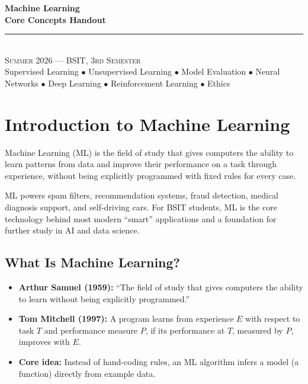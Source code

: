 \documentclass[11pt,a4paper]{article}
\begin{document}
\begin{center}
\vspace*{0.5cm}
{\Huge\bfseries\textcolor{primary}{Machine Learning}}\\[8pt]
{\Huge\bfseries\textcolor{primary}{Core Concepts Handout}}\\[16pt]
{\color{secondary}\rule{0.68\textwidth}{1.5pt}}\\[14pt]
{\Large\textsc{Summer 2026 --- BSIT, 3rd Semester}}\\[8pt]
{\large\textcolor{gray!70!black}{Supervised Learning $\bullet$ Unsupervised Learning $\bullet$ Model Evaluation $\bullet$ Neural Networks $\bullet$ Deep Learning $\bullet$ Reinforcement Learning $\bullet$ Ethics}}
\vspace{0.3cm}
\end{center}

\tableofcontents
\newpage

\section{Introduction to Machine Learning}

\begin{definitionbox}
Machine Learning (ML) is the field of study that gives computers the ability to learn patterns from data and improve their performance on a task through experience, without being explicitly programmed with fixed rules for every case.
\end{definitionbox}

\begin{conceptbox}
ML powers spam filters, recommendation systems, fraud detection, medical diagnosis support, and self-driving cars. For BSIT students, ML is the core technology behind most modern ``smart'' applications and a foundation for further study in AI and data science.
\end{conceptbox}

\subsection{What Is Machine Learning?}
\begin{itemize}[leftmargin=*]
  \item \textbf{Arthur Samuel (1959):} ``The field of study that gives computers the ability to learn without being explicitly programmed.''
  \item \textbf{Tom Mitchell (1997):} A program learns from experience $E$ with respect to task $T$ and performance measure $P$, if its performance at $T$, measured by $P$, improves with $E$.
  \item \textbf{Core idea:} Instead of hand-coding rules, an ML algorithm infers a model (a function) directly from example data.
\end{itemize}
\end{document}
